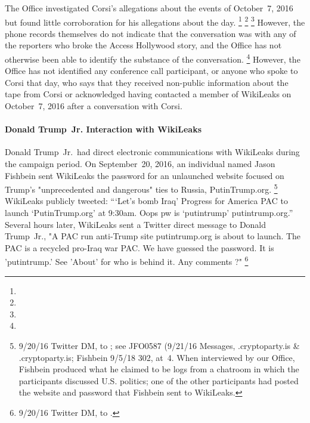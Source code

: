 The Office investigated Corsi's allegations about the events of October~7, 2016 but found little corroboration for his allegations about the day.%
\footnote{ }
\footnote{}
\footnote{  }
However, the phone records themselves do not indicate that the conversation was with any of the reporters who broke the Access Hollywood story, and the Office has not otherwise been able to identify the substance of the conversation.
\footnote{    }
However, the Office has not identified any conference call participant, or anyone who spoke to Corsi that day, who says that they received non-public information about the tape from Corsi or acknowledged having contacted a member of WikiLeaks on October~7, 2016 after a conversation with Corsi.

\paragraph{Donald Trump~Jr. Interaction with WikiLeaks}

Donald Trump~Jr.\ had direct electronic communications with WikiLeaks during the campaign period.
On September~20, 2016, an individual named Jason Fishbein sent WikiLeaks the password for an unlaunched website focused on Trump's "unprecedented and dangerous" ties to Russia, PutinTrump.org.%
\footnote{9/20/16 Twitter DM, \@JasonFishbein to \@WikiLeaks;
see JFO0587 (9/21/16 Messages, \@jabber.cryptoparty.is \& \@jabber.cryptoparty.is;
Fishbein 9/5/18 302, at~4.
When interviewed by our Office, Fishbein produced what he claimed to be logs from a chatroom in which the participants discussed U.S. politics;
one of the other participants had posted the website and password that Fishbein sent to WikiLeaks.}
WikiLeaks publicly tweeted: ``\thinspace`Let's bomb Iraq'
Progress for America PAC to launch `PutinTrump.org' at 9:30am. Oops pw is `putintrump' putintrump.org.''
Several hours later, WikiLeaks sent a Twitter direct message to Donald Trump~Jr., "A PAC run anti-Trump site putintrump.org is about to launch.
The PAC is a recycled pro-Iraq war PAC\null.
We have guessed the password.
It is 'putintrump.'
See 'About' for who is behind it.
Any comments ?"%
\footnote{9/20/16 Twitter DM, \@WikiLeaks to \@DonaldJTrumpJr.}

